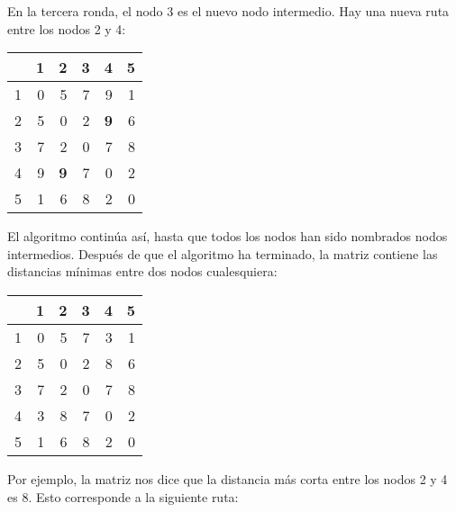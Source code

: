 En la tercera ronda, el nodo 3 es el nuevo nodo intermedio.
Hay una nueva ruta entre los nodos 2 y 4:

\begin{center}
\begin{tabular}{r|rrrrr}
 & 1 & 2 & 3 & 4 & 5 \\
\hline
1 & 0 & 5 & 7 & 9 & 1 \\
2 & 5 & 0 & 2 & \textbf{9} & 6 \\
3 & 7 & 2 & 0 & 7 & 8 \\
4 & 9 & \textbf{9} & 7 & 0 & 2 \\
5 & 1 & 6 & 8 & 2 & 0 \\
\end{tabular}
\end{center}
\vspace{10pt}

El algoritmo continúa así,
hasta que todos los nodos han sido nombrados nodos intermedios.
Después de que el algoritmo ha terminado, la matriz contiene
las distancias mínimas entre dos nodos cualesquiera:

\begin{center}
\begin{tabular}{r|rrrrr}
 & 1 & 2 & 3 & 4 & 5 \\
\hline
1 & 0 & 5 & 7 & 3 & 1 \\
2 & 5 & 0 & 2 & 8 & 6 \\
3 & 7 & 2 & 0 & 7 & 8 \\
4 & 3 & 8 & 7 & 0 & 2 \\
5 & 1 & 6 & 8 & 2 & 0 \\
\end{tabular}
\end{center}

Por ejemplo, la matriz nos dice que la
distancia más corta entre los nodos 2 y 4 es 8.
Esto corresponde a la siguiente ruta:

\begin{center}
\end{center}

